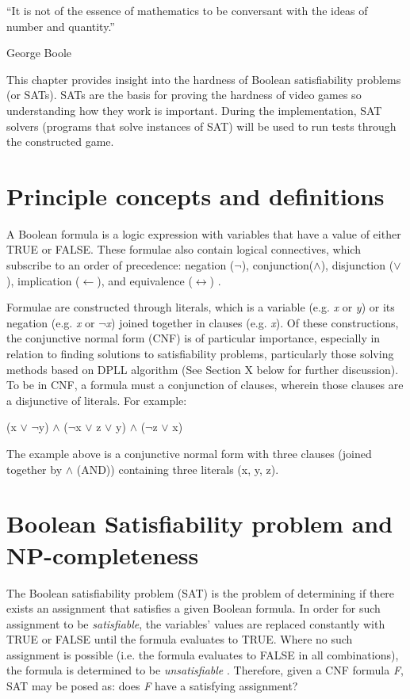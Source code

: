 \documentclass[11pt, a4paper, oneside]{report} %
\begin{document}
\epigraph{``It is not of the essence of mathematics to be conversant with the
ideas of number and quantity.''}{George Boole}


This chapter provides insight into the hardness of Boolean satisfiability
problems (or SATs). SATs are the basis for proving the hardness of video games
so understanding how they work is important. During the implementation, SAT
solvers (programs that solve instances of SAT) will be used to run tests through
the constructed game.

\section{Principle concepts and definitions}

A Boolean formula is a logic expression with variables that have a value of
either TRUE or FALSE. These formulae also contain logical connectives, which
subscribe to an order of precedence: negation ($\neg$), conjunction($\wedge$),
disjunction ($\vee$), implication ($\leftarrow$), and equivalence
($\leftrightarrow$) \cite{balyo2010solving,gomes2008satisfiability}.

Formulae are constructed through literals, which is a variable (e.g. \textit{x}
or \textit{y})  or its negation (e.g. \textit{x} or $\neg$\textit{x}) joined
together in clauses (e.g. \textit{x}). Of these constructions, the conjunctive
normal form (CNF) is of particular importance, especially in relation to finding
solutions to satisfiability problems, particularly those solving methods based
on DPLL algorithm \cite{gomes2008satisfiability} (See Section X below for
further discussion). To be in CNF, a formula must a conjunction of clauses,
wherein those clauses are a disjunctive of literals. For example:

\centerline{(x $\vee$ $\neg$y) $\wedge$ ($\neg$x $\vee$ z $\vee$ y) $\wedge$ ($\neg$z $\vee$ x)}

\par  \noindent The example above is a conjunctive normal form with three clauses (joined together by $\wedge$ (AND)) containing three literals (x, y, z).

\section{Boolean Satisfiability problem and NP-completeness}

The Boolean satisfiability problem (SAT) is the problem of determining if there
exists an assignment that satisfies a given Boolean formula. In order for such
assignment to be \textit{satisfiable}, the variables' values are replaced
constantly with TRUE or FALSE until the formula evaluates to TRUE. Where no such
assignment is possible (i.e. the formula evaluates to FALSE in all
combinations), the formula is determined to be \textit{unsatisfiable}
\cite{balyo2010solving,gomes2008satisfiability}. Therefore, given a CNF formula
\textit{F}, SAT may be posed as: does \textit{F} have a satisfying assignment?
\end{document}

